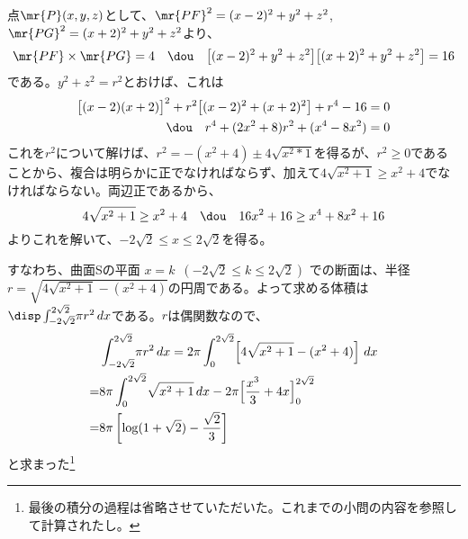 点$\mr{P}(x, y, z)$として、$\mr{PF}^2=(x-2)^2+y^2+z^2$, $\mr{PG}^2=(x+2)^2+y^2+z^2$より、
\[ \mr{PF}\times\mr{PG}=4 \quad\dou\quad \bigl[(x-2)^2+y^2+z^2\bigr]\bigl[(x+2)^2+y^2+z^2\bigr] = 16 \]
である。$y^2+z^2=r^2$とおけば、これは
\begin{align*}
 \bigl[(x-2)(x+2)\bigr]^2+r^2\bigl[(x-2)^2+(x+2)^2\bigr]+r^4-16&=0 \\
 \dou\quad r^4+(2x^2+8)r^2+(x^4-8x^2) &= 0 
\end{align*}
これを$r^2$について解けば、$r^2=-(x^2+4)\pm4\sqrt{x^2*1}$を得るが、$r^2\ge 0$であることから、複合は明らかに正でなければならず、加えて$4\sqrt{x^2+1}\ge x^2+4$でなければならない。両辺正であるから、
\[ 4\sqrt{x^2+1}\ge x^2+4 \quad\dou\quad 16x^2+16\ge x^4+8x^2+16 \]
よりこれを解いて、$-2\sqrt{2}\le x\le 2\sqrt{2}$を得る。

すなわち、曲面Sの平面 $x=k$~$(-2\sqrt{2}\le k\le 2\sqrt{2})$ での断面は、半径 $r=\sqrt{4\sqrt{x^2+1}-(x^2+4)}$の円周である。よって求める体積は$\disp \int_{-2\sqrt{2}}^{2\sqrt{2}}\! \pi r^2 \,dx$である。$r$は偶関数なので、
\begin{align*}
 & \int_{-2\sqrt{2}}^{2\sqrt{2}}\! \pi r^2 \,dx = 2\pi \int_0^{2\sqrt{2}}\! \left[4\sqrt{x^2+1}-(x^2+4)\right] \,dx \\
 =& 8\pi\int_0^{2\sqrt{2}}\!\sqrt{x^2+1} \,dx - 2\pi\Bigl[\frac{x^3}{3}+4x\Bigr]_0^{2\sqrt{2}} \\
 =& 8\pi\left[\log(1+\sqrt{2})-\frac{\sqrt{2}}{3}\right]
\end{align*}
と求まった\footnote{最後の積分の過程は省略させていただいた。これまでの小問の内容を参照して計算されたし。}
